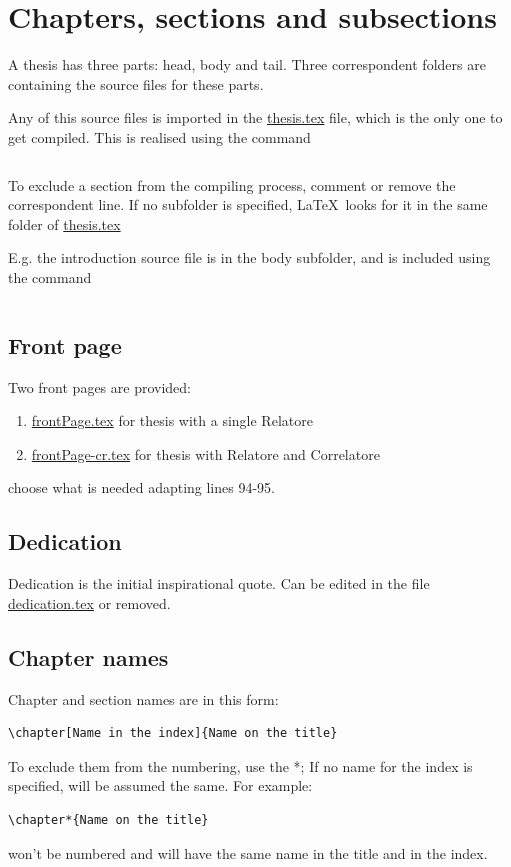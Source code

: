 \section[Sectioning]{Chapters, sections and subsections}

A thesis has three parts: head, body and tail. Three correspondent folders are containing the source files for these parts.

Any of this source files is imported in the \url{thesis.tex} file, which is the only one to get compiled. This is realised using the command
\begin{verbatim}

\end{verbatim}
To exclude a section from the compiling process, comment or remove the correspondent line. If no subfolder is specified, \LaTeX\ looks for it in the same folder of \url{thesis.tex}

E.g. the introduction source file is in the body subfolder, and is included using the command \begin{verbatim}  \end{verbatim}

\subsection{Front page}

Two front pages are provided: 
\begin{enumerate}
\item \url{frontPage.tex} for thesis with a single Relatore
\item \url{frontPage-cr.tex} for thesis with Relatore and Correlatore
\end{enumerate}
choose what is needed adapting lines 94-95.

\subsection{Dedication}
Dedication is the initial inspirational quote. Can be edited in the file \url{dedication.tex} or removed.

\subsection{Chapter names}
Chapter and section names are in this form:
\begin{verbatim}
\chapter[Name in the index]{Name on the title}
\end{verbatim}
To exclude them from the numbering, use the *; If no name for the index is specified, will be assumed the same. For example:
\begin{verbatim}
\chapter*{Name on the title}
\end{verbatim}
won't be numbered and will have the same name in the title and in the index.

